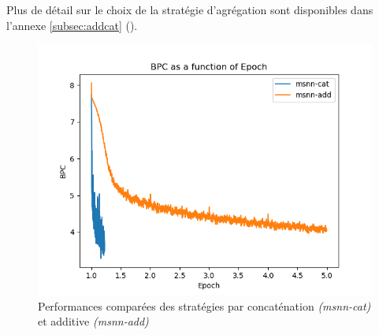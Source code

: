 Plus de détail sur le choix de la stratégie d'agrégation sont disponibles dans l'annexe \ref{subsec:addcat} (). 

\begin{figure}[H]
	\centering
	\includegraphics[width=\textwidth]{parts/appendix/reports-gmsnn/docs_esteban-latex/test_reports/comparative-bpc-msnn-det-msnn-cat.png}
	\caption[Performances comparées des stratégies additive et par concaténation]{Performances comparées des stratégies par concaténation \textit{(msnn-cat)} et additive \textit{(msnn-add)}}\label{fig:addcat}
\end{figure}